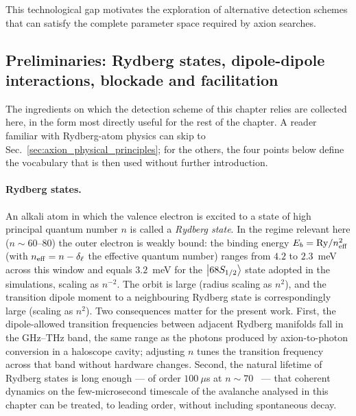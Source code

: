 This technological gap motivates the exploration of alternative detection schemes that can satisfy the complete parameter space required by axion searches.

\subsection*{Preliminaries: Rydberg states, dipole-dipole interactions, blockade and facilitation}
\label{sec:rydberg_preliminaries}

The ingredients on which the detection scheme of this chapter relies are
collected here, in the form most directly useful for the rest of the
chapter. A reader familiar with Rydberg-atom physics can skip to
Sec.~\ref{sec:axion_physical_principles}; for the others, the four
points below define the vocabulary that is then used without further
introduction.

\paragraph{Rydberg states.}
An alkali atom in which the valence electron is excited to a state of
high principal quantum number $n$ is called a \emph{Rydberg state}. In
the regime relevant here ($n \sim 60$--$80$) the outer electron is
weakly bound: the binding energy $E_b = \mathrm{Ry}/n_{\rm eff}^{2}$
(with $n_{\rm eff} = n - \delta_\ell$ the effective quantum number)
ranges from $4.2$ to $2.3$~meV across this window and equals
$3.2$~meV for the $\ket{68S_{1/2}}$ state adopted in the simulations,
scaling as $n^{-2}$. The
orbit is large (radius scaling as $n^{2}$), and the transition dipole
moment to a neighbouring Rydberg state is correspondingly large
(scaling as $n^{2}$). Two consequences matter for the present work.
First, the dipole-allowed transition frequencies between adjacent
Rydberg manifolds fall in the GHz--THz band, the same range as the
photons produced by axion-to-photon conversion in a haloscope cavity;
adjusting $n$ tunes the transition frequency across that band without
hardware changes. Second, the natural lifetime of Rydberg states is
long enough --- of order $100~\mu$s at $n \sim 70$~\cite{Beterov2009}
--- that coherent dynamics on the few-microsecond timescale of the
avalanche analysed in this chapter can be treated, to leading order,
without including spontaneous decay.

